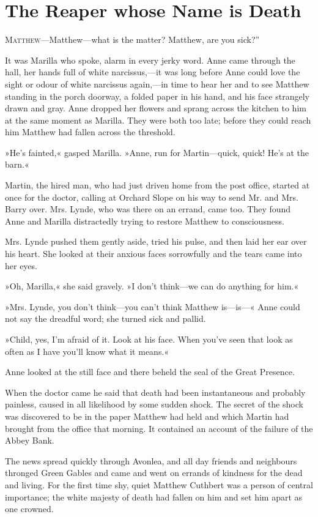 \chapter{The Reaper whose Name is Death}

\lettrine[ante=“,lines=4]{M}{atthew}—Matthew—what is the matter? Matthew, are you sick?”

\zz
It was Marilla who spoke, alarm in every jerky word. Anne came through the hall, her hands full of white narcissus,—it was long before Anne could love the sight or odour of white narcissus again,—in time to hear her and to see Matthew standing in the porch doorway, a folded paper in his hand, and his face strangely drawn and gray. Anne dropped her flowers and sprang across the kitchen to him at the same moment as Marilla. They were both too late; before they could reach him Matthew had fallen across the threshold.

»He’s fainted,« gasped Marilla. »Anne, run for Martin—quick, quick! He’s at the barn.«

Martin, the hired man, who had just driven home from the post office, started at once for the doctor, calling at Orchard Slope on his way to send Mr. and Mrs. Barry over. Mrs. Lynde, who was there on an errand, came too. They found Anne and Marilla distractedly trying to restore Matthew to consciousness.

Mrs. Lynde pushed them gently aside, tried his pulse, and then laid her ear over his heart. She looked at their anxious faces sorrowfully and the tears came into her eyes.

»Oh, Marilla,« she said gravely. »I don’t think—we can do anything for him.«

»Mrs. Lynde, you don’t think—you can’t think Matthew is—is—« Anne could not say the dreadful word; she turned sick and pallid.

»Child, yes, I’m afraid of it. Look at his face. When you’ve seen that look as often as I have you’ll know what it means.«

Anne looked at the still face and there beheld the seal of the Great Presence.

When the doctor came he said that death had been instantaneous and probably painless, caused in all likelihood by some sudden shock. The secret of the shock was discovered to be in the paper Matthew had held and which Martin had brought from the office that morning. It contained an account of the failure of the Abbey Bank.

The news spread quickly through Avonlea, and all day friends and neighbours thronged Green Gables and came and went on errands of kindness for the dead and living. For the first time shy, quiet Matthew Cuthbert was a person of central importance; the white majesty of death had fallen on him and set him apart as one crowned.

